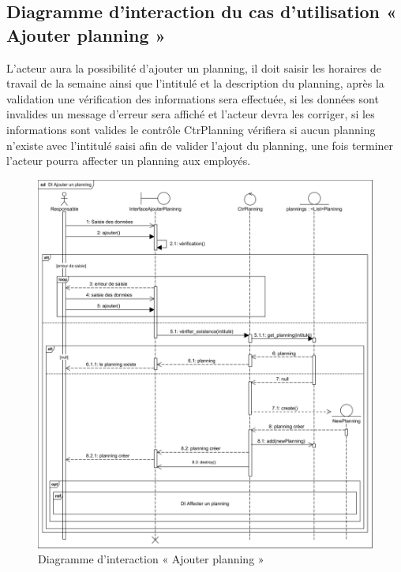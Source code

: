         \subsection*{Diagramme d'interaction du cas d'utilisation « Ajouter planning »}
        L’acteur aura la possibilité d’ajouter un planning, il doit saisir les horaires de travail de la semaine ainsi que l’intitulé et la description du planning, après la validation une vérification des informations sera effectuée, si les données sont invalides un message d’erreur sera affiché et l’acteur devra les corriger, si les informations sont valides le contrôle CtrPlanning vérifiera si aucun planning n’existe avec l’intitulé saisi afin de valider l’ajout du planning, une fois terminer l’acteur pourra affecter un planning aux employés.
        \clearpage
        \begin{figure}[h!]
                 \centering
                \includegraphics[scale=0.74]{images/DS/DI Ajouter un planning.png}
                 \caption{Diagramme d'interaction « Ajouter planning »}
                 \label{fig39}
        \end{figure}
        
        

